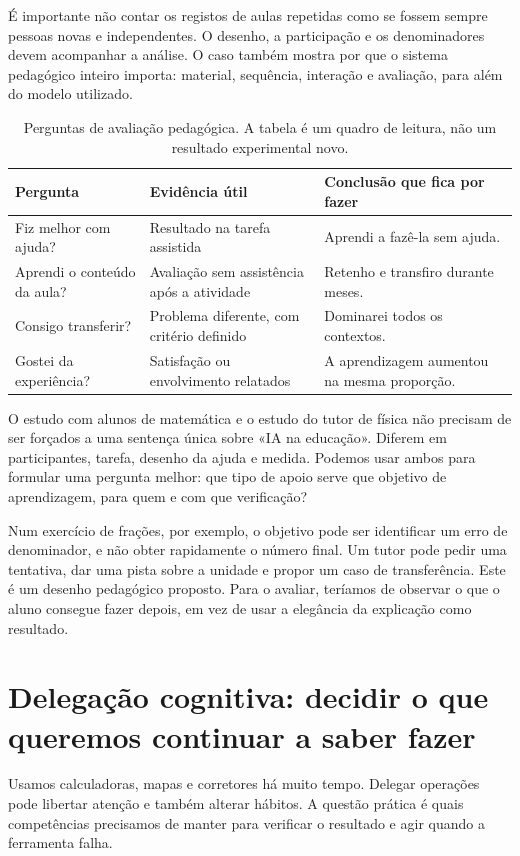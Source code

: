 É importante não contar os registos de aulas repetidas como se fossem sempre pessoas novas e independentes. O desenho, a participação e os denominadores devem acompanhar a análise. O caso também mostra por que o sistema pedagógico inteiro importa: material, sequência, interação e avaliação, para além do modelo utilizado.

\begin{table}[htbp]
\small
\begin{tabularx}{\textwidth}{@{}XXX@{}}
\toprule
Pergunta & Evidência útil & Conclusão que fica por fazer \\
\midrule
Fiz melhor com ajuda? & Resultado na tarefa assistida & Aprendi a fazê-la sem ajuda. \\
Aprendi o conteúdo da aula? & Avaliação sem assistência após a atividade & Retenho e transfiro durante meses. \\
Consigo transferir? & Problema diferente, com critério definido & Dominarei todos os contextos. \\
Gostei da experiência? & Satisfação ou envolvimento relatados & A aprendizagem aumentou na mesma proporção. \\
\bottomrule
\end{tabularx}
\caption{Perguntas de avaliação pedagógica. A tabela é um quadro de leitura, não um resultado experimental novo.}
\end{table}

O estudo com alunos de matemática e o estudo do tutor de física não precisam de ser forçados a uma sentença única sobre «IA na educação». Diferem em participantes, tarefa, desenho da ajuda e medida. Podemos usar ambos para formular uma pergunta melhor: que tipo de apoio serve que objetivo de aprendizagem, para quem e com que verificação?

Num exercício de frações, por exemplo, o objetivo pode ser identificar um erro de denominador, e não obter rapidamente o número final. Um tutor pode pedir uma tentativa, dar uma pista sobre a unidade e propor um caso de transferência. Este é um desenho pedagógico proposto. Para o avaliar, teríamos de observar o que o aluno consegue fazer depois, em vez de usar a elegância da explicação como resultado.

\section{Delegação cognitiva: decidir o que queremos continuar a saber fazer}
Usamos calculadoras, mapas e corretores há muito tempo. Delegar operações pode libertar atenção e também alterar hábitos. A questão prática é quais competências precisamos de manter para verificar o resultado e agir quando a ferramenta falha.

